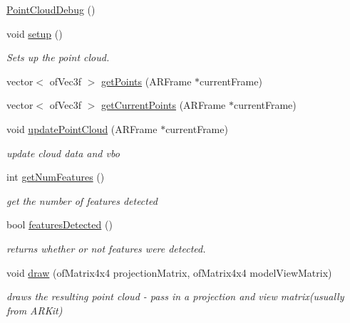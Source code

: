 \begin{DoxyCompactItemize}
\item 
\mbox{\hyperlink{class_a_r_debug_utils_1_1_point_cloud_debug_a7de6576b45c662cddc632e7b9d7c9bd7}{Point\+Cloud\+Debug}} ()
\item 
void \mbox{\hyperlink{class_a_r_debug_utils_1_1_point_cloud_debug_a04e1ac43f026e32bb5b4877d41d69528}{setup}} ()
\begin{DoxyCompactList}\small\item\em Sets up the point cloud. \end{DoxyCompactList}\item 
vector$<$ of\+Vec3f $>$ \mbox{\hyperlink{class_a_r_debug_utils_1_1_point_cloud_debug_abf68c97daba914eb42e084234ca4c980}{get\+Points}} (A\+R\+Frame $\ast$current\+Frame)
\item 
vector$<$ of\+Vec3f $>$ \mbox{\hyperlink{class_a_r_debug_utils_1_1_point_cloud_debug_a62e8829bd3cdcc822fda0962e1abcac9}{get\+Current\+Points}} (A\+R\+Frame $\ast$current\+Frame)
\item 
void \mbox{\hyperlink{class_a_r_debug_utils_1_1_point_cloud_debug_a02a8d4c24ec4b19c238288874a568a9f}{update\+Point\+Cloud}} (A\+R\+Frame $\ast$current\+Frame)
\begin{DoxyCompactList}\small\item\em update cloud data and vbo \end{DoxyCompactList}\item 
int \mbox{\hyperlink{class_a_r_debug_utils_1_1_point_cloud_debug_a0757ac82a88433c519ec6362ac8cd251}{get\+Num\+Features}} ()
\begin{DoxyCompactList}\small\item\em get the number of features detected \end{DoxyCompactList}\item 
bool \mbox{\hyperlink{class_a_r_debug_utils_1_1_point_cloud_debug_abfaa58360f92ad1b41692175107c99a8}{features\+Detected}} ()
\begin{DoxyCompactList}\small\item\em returns whether or not features were detected. \end{DoxyCompactList}\item 
void \mbox{\hyperlink{class_a_r_debug_utils_1_1_point_cloud_debug_a308b87459dd4f0fc89f25bc65ad7b383}{draw}} (of\+Matrix4x4 projection\+Matrix, of\+Matrix4x4 model\+View\+Matrix)
\begin{DoxyCompactList}\small\item\em draws the resulting point cloud -\/ pass in a projection and view matrix(usually from A\+R\+Kit) \end{DoxyCompactList}\end{DoxyCompactItemize}
